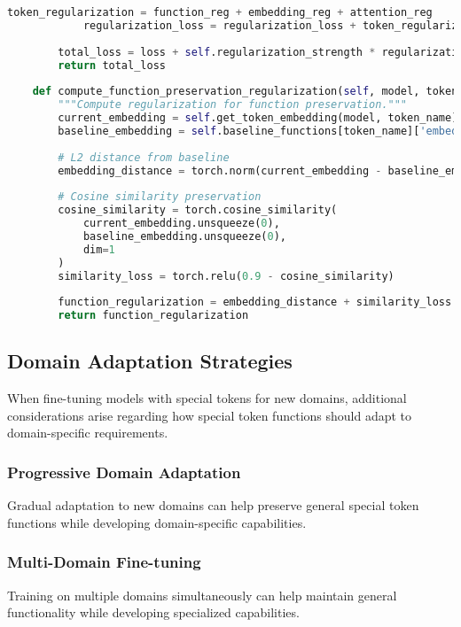 \begin{lstlisting}[language=Python, caption=Function-preserving fine-tuning framework]
            token_regularization = function_reg + embedding_reg + attention_reg
            regularization_loss = regularization_loss + token_regularization
        
        total_loss = loss + self.regularization_strength * regularization_loss
        return total_loss
    
    def compute_function_preservation_regularization(self, model, token_name):
        """Compute regularization for function preservation."""
        current_embedding = self.get_token_embedding(model, token_name)
        baseline_embedding = self.baseline_functions[token_name]['embedding']
        
        # L2 distance from baseline
        embedding_distance = torch.norm(current_embedding - baseline_embedding, p=2)
        
        # Cosine similarity preservation
        cosine_similarity = torch.cosine_similarity(
            current_embedding.unsqueeze(0), 
            baseline_embedding.unsqueeze(0),
            dim=1
        )
        similarity_loss = torch.relu(0.9 - cosine_similarity)
        
        function_regularization = embedding_distance + similarity_loss
        return function_regularization
\end{lstlisting}

\subsection{Domain Adaptation Strategies}

When fine-tuning models with special tokens for new domains, additional considerations arise regarding how special token functions should adapt to domain-specific requirements.

\subsubsection{Progressive Domain Adaptation}

Gradual adaptation to new domains can help preserve general special token functions while developing domain-specific capabilities.

\subsubsection{Multi-Domain Fine-tuning}

Training on multiple domains simultaneously can help maintain general functionality while developing specialized capabilities.

